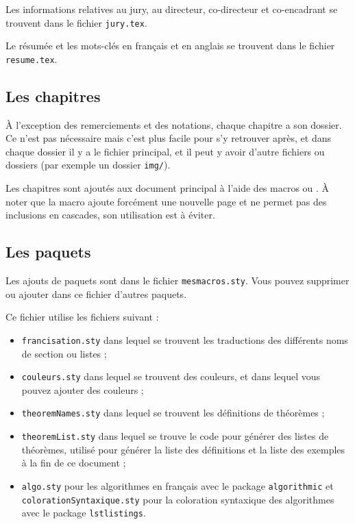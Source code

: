   Les informations relatives au jury, au directeur, co-directeur et co-encadrant se trouvent dans le fichier \texttt{jury.tex}.
  
  Le résumée et les mots-clés en français et en anglais se trouvent dans le fichier \texttt{resume.tex}.
  
  \subsection{Les chapitres}
  À l'exception des remerciements et des notations, chaque chapitre a son dossier. 
  Ce n'est pas nécessaire mais c'est plus facile pour s'y retrouver après, et dans chaque dossier il y a le fichier principal, et il peut y avoir d'autre fichiers ou dossiers (par exemple un dossier \texttt{img/}).
  
  Les chapitres sont ajoutés aux document principal à l'aide des macros \verb|| ou \verb||. À noter que la macro \verb|| ajoute forcément une nouvelle page et ne permet pas des inclusions en cascades, son utilisation est à éviter.
  
  \subsection{Les paquets}
  Les ajouts de paquets sont dans le fichier \texttt{mesmacros.sty}. Vous pouvez supprimer ou ajouter dans ce fichier d'autres paquets. 
  
  Ce fichier utilise les fichiers suivant :
  \begin{itemize}
    \item \texttt{francisation.sty} dans lequel se trouvent les traductions des différents noms de section ou listes ;
    \item \texttt{couleurs.sty} dans lequel se trouvent des couleurs, et dans lequel vous pouvez ajouter des couleurs ;
    \item \texttt{theoremNames.sty} dans lequel se trouvent les définitions de théorèmes ;
    \item \texttt{theoremList.sty} dans lequel se trouve le code pour générer des listes de théorèmes, utilisé pour générer la liste des définitions et la liste des exemples à la fin de ce document ;
    \item \texttt{algo.sty} pour les algorithmes en français avec le package \texttt{algorithmic} et \texttt{colorationSyntaxique.sty} pour la coloration syntaxique des algorithmes avec le package \texttt{lstlistings}.
  \end{itemize}

